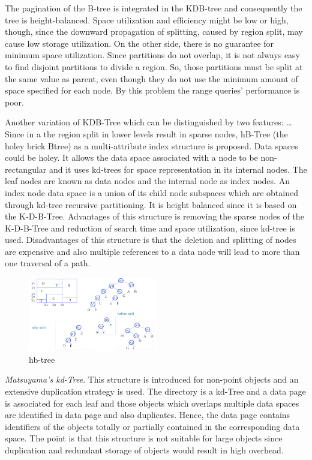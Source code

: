 \documentclass[a4paper,12pt]{article}
\begin{document}
The pagination of the B-tree is integrated in the KDB-tree and consequently the tree is height-balanced. Space utilization and efficiency might be low or high, though, since the downward propagation of splitting, caused by region split, may cause low storage utilization. On the other side, there is no guarantee for minimum space utilization. Since partitions do not overlap, it is not always easy to find disjoint partitions to divide a region. So, those partitions must be split at the same value as parent, even though they do not use the minimum amount of space specified for each node. By this problem the range queries' performance is poor. 

Another variation of KDB-Tree which can be distinguished by two features: …
Since in a the region split in lower levels result in sparse nodes, hB-Tree (the holey brick Btree) as a multi-attribute index structure is proposed. Data spaces could be holey. It allows the data space associated with a node to be non-rectangular and it uses kd-trees for space representation in its internal nodes. The leaf nodes are known as data nodes and the internal node as index nodes. An index node data space is a union of its child node subspaces which are obtained through kd-tree recursive partitioning. It is height balanced since it is based on the K-D-B-Tree. 
Advantages of this structure is removing the sparse nodes of the K-D-B-Tree and reduction of search time and space utilization, since kd-tree is used. 
Disadvantages of this structure is that the deletion and splitting of nodes are expensive and also multiple references to a data node will lead to more than one traversal of a path.

\begin{figure}
\centering
\includegraphics[width=0.5\textwidth]{hbtree}
\caption{hb-tree}
\label{fighbtree}
\end{figure}

\emph{Matsuyama’s kd-Tree}.
This structure is introduced for non-point objects and an extensive duplication strategy is used. The directory is a kd-Tree and a data page is associated for each leaf and those objects which overlaps multiple data spaces are identified in data page and also duplicates. Hence, the data page contains identifiers of the objects totally or partially contained in the corresponding data space.
The point is that this structure is not suitable for large objects since duplication and redundant storage of objects would result in high overhead.
\end{document}
